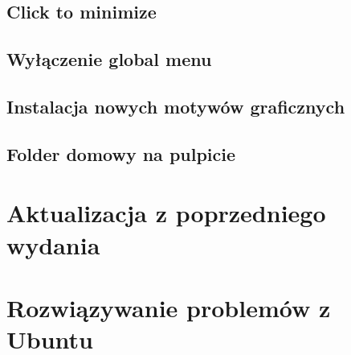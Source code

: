 \documentclass[a4paper,11pt,oneside]{mwart}
\begin{document}
	\subsection{Click to minimize}
	\subsection{Wyłączenie global menu}
	\subsection{Instalacja nowych motywów graficznych}
	\subsection{Folder domowy na pulpicie}
\section{Aktualizacja z poprzedniego wydania}
\section{Rozwiązywanie problemów z Ubuntu}
\end{document}
